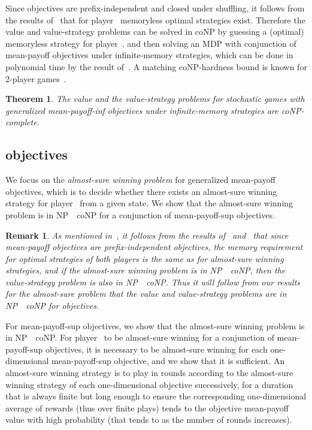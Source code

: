 \documentclass{article}
\newtheorem{theorem}{Theorem}
\newtheorem{remark}{Remark}
\begin{document}
Since  objectives are prefix-independent and closed under shuffling, 
it follows from the results of~\cite[Theorem~5.2]{GK14}
that for player~ memoryless optimal strategies exist. Therefore the
value and value-strategy problems can be solved in coNP by guessing a (optimal)
memoryless strategy for player~, and then solving an MDP with conjunction
of mean-payoff objectives under infinite-memory strategies, which can be done in 
polynomial time by the result of~\cite[Section~3.2]{BBCFK14}.
A matching coNP-hardness bound is known for 2-player games~\cite[Theorem~7]{VCDHRR15}.

\begin{theorem}\label{theo:mean-payoff-inf-infinite}
The value and the value-strategy problems for stochastic games 
with generalized mean-payoff-inf objectives under infinite-memory 
strategies 
are coNP-complete.
\end{theorem}




\subsection{ objectives}

We focus on the \emph{almost-sure winning problem} for generalized mean-payoff objectives, 
which is to decide whether there exists an almost-sure winning strategy 
for player~ from a given state.
We show that the almost-sure winning problem is in NP~~coNP for a conjunction
of mean-payoff-sup objectives.

\begin{remark}\label{rem:red-almost-sure}
As mentioned in~\cite[Remark~1]{CDGO14}, it follows from the results of~\cite[Lemma~7]{CHH09} 
and~\cite[Theorem~4.1]{GH10} that since mean-payoff objectives are prefix-independent objectives,
the memory requirement for optimal strategies of both players is the same as 
for almost-sure winning strategies, and if the almost-sure winning problem is in 
NP~~coNP, then the value-strategy problem is also in 
NP~~coNP. Thus it will follow from our results
for the almost-sure problem 
that the value and value-strategy problems are 
in NP~~coNP for  objectives.
\end{remark}




For mean-payoff-sup objectives, we show that the almost-sure winning problem
is in NP~~coNP. For player~ to be almost-sure winning for a conjunction
of mean-payoff-sup objectives, it is necessary to be almost-sure winning for
each one-dimensional mean-payoff-sup objective, and we show that it is sufficient.
An almost-sure winning strategy is to play in rounds according to the almost-sure winning
strategy of each one-dimensional objective successively, for a duration that
is always finite but long enough to ensure the corresponding one-dimensional 
average of rewards (thus over finite plays) tends to the objective mean-payoff value
with high probability (that tends to  as the number of rounds increases).
\end{document}
